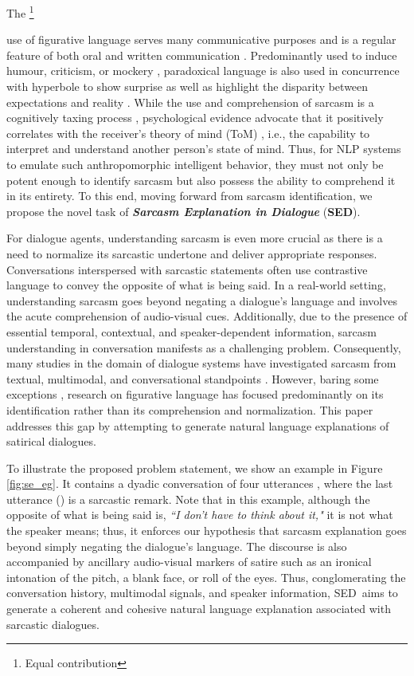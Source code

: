\documentclass[11pt]{article}
\newcommand{\task}{\textsc{SED}}
\newcommand\blfootnote[1]{\begingroup
  \renewcommand\thefootnote{}\footnote{#1}\addtocounter{footnote}{-1}\endgroup
}
\begin{document}
The\blfootnote{Equal contribution} use of figurative language serves many communicative purposes and is a regular feature of both oral and written communication \citep{roberts1994people}. 
Predominantly used to induce humour, criticism, or mockery \citep{colston1997salting}, paradoxical language is also used in concurrence with hyperbole to show surprise \citep{colston1998you} as well as highlight the disparity between expectations and reality \citep{ivanko2003context}. While the use and comprehension of sarcasm is a cognitively taxing process \citep{olkoniemi2016individual}, psychological evidence advocate that it positively correlates with the receiver's theory of mind (ToM) \citep{wellman2014making}, i.e., the capability to interpret and understand another person's state of mind. Thus, for NLP systems to emulate such anthropomorphic intelligent behavior, they must not only be potent enough to identify sarcasm but also possess the ability to comprehend it in its entirety. To this end, moving forward from sarcasm identification, we propose the novel task of \textit{\textbf{Sarcasm Explanation in Dialogue}} ({\bf \task}).

For dialogue agents, understanding sarcasm is even more crucial as there is a need to normalize its sarcastic undertone and deliver appropriate responses. Conversations interspersed with sarcastic statements often use contrastive language to convey the opposite of what is being said. In a real-world setting, understanding sarcasm goes beyond negating a dialogue's language and involves the acute comprehension of audio-visual cues. Additionally, due to the presence of essential temporal, contextual, and speaker-dependent information, sarcasm understanding in conversation manifests as a challenging problem. Consequently, many studies in the domain of dialogue systems have investigated sarcasm from textual, multimodal, and conversational standpoints \cite{10.1162/coli_a_00336, castro2019multimodal, oraby2017serious, 9442359}. However, baring some exceptions \citep{mishra-etal-2019-modular, dubey2019deep, chakrabarty-etal-2020-r}, research on figurative language has focused predominantly on its identification rather than its comprehension and normalization. This paper addresses this gap by attempting to generate natural language explanations of satirical dialogues.

To illustrate the proposed problem statement, we show an example in Figure \ref{fig:se_eg}. It contains a dyadic conversation of four utterances , where the last utterance () is a sarcastic remark. Note that in this example, although the opposite of what is being said is, \textit{``I don't have to think about it,"} it is not what the speaker means; thus, it enforces our hypothesis that sarcasm explanation goes beyond simply negating the dialogue's language. The discourse is also accompanied by ancillary audio-visual markers of satire such as an ironical intonation of the pitch, a blank face, or roll of the eyes. Thus, conglomerating the conversation history, multimodal signals, and speaker information,  \task\ aims to generate a coherent and cohesive natural language explanation associated with sarcastic dialogues.
\end{document}
